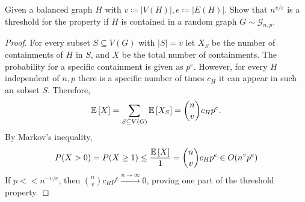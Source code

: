 \begin{aufgabe}
	Given a balanced graph $H$ with $v \coloneqq |V(H)|, e \coloneqq |E(H)|$.
	Show that $n^{v/e}$ is a threshold for the property if $H$ is contained in a random graph $G \sim \mathcal{G}_{n,p}$.
	\begin{proof}
		For every subset $S \subseteq V(G)$ with $|S| = v$ let $X_S$ be the number of containments of $H$ in $S$, and $X$ be the total number of containments.
		The probability for a specific containment is given as $p^e$.
		However, for every $H$ independent of $n,p$ there is a specific number of times $c_H$ it can appear in such an subset $S$.
		Therefore,
		\begin{align*}
			\mathbb{E}\left[X\right] = \sum_{S \subseteq V(G)}\mathbb{E}\left[X_S\right] = \binom{n}{v} c_H p^e.
		\end{align*}
		By Markov's inequality,
		\begin{align*}
			P(X > 0) = P(X \geq 1) \leq \frac{\mathbb{E}\left[X\right]}{1}=\binom{n}{v} c_H p^e \in O(n^vp^e)
		\end{align*}
		If $p << n^{-v/e}$, then $\binom{n}{v} c_H p^e  \xrightarrow{n \rightarrow \infty} 0$, proving one part of the threshold property.


\end{proof}
\end{aufgabe}

